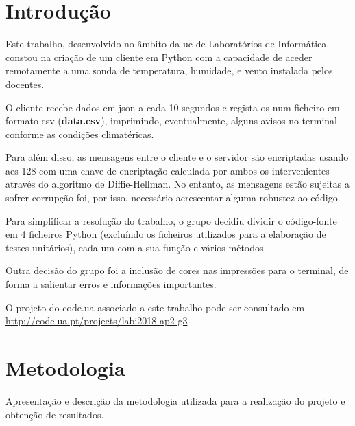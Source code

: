 \documentclass{report}
\begin{document}
\tableofcontents
\listoffigures


\clearpage
{}


\chapter{Introdução}
\label{chap.introducao}

Este trabalho, desenvolvido no âmbito da \ac{uc} de Laboratórios de Informática, constou na criação de um cliente em Python com a capacidade de aceder remotamente a uma sonda de temperatura, humidade, e vento instalada pelos docentes. 

O cliente recebe dados em \ac{json} a cada 10 segundos e regista-os num ficheiro em formato \ac{csv} (\textbf{data.csv}), imprimindo, eventualmente, alguns avisos no terminal conforme as condições climatéricas.\newline

Para além disso, as mensagens entre o cliente e o servidor são encriptadas usando \ac{aes}-128 com uma chave de encriptação calculada por ambos os intervenientes através do algoritmo de Diffie-Hellman. No entanto, as mensagens estão sujeitas a sofrer corrupção foi, por isso, necessário acrescentar alguma robustez ao código.\newline

\hfill

Para simplificar a resolução do trabalho, o grupo decidiu dividir o código-fonte em 4 ficheiros Python (excluíndo os ficheiros utilizados para a elaboração de testes unitários), cada um com a sua função e vários métodos. 

Outra decisão do grupo foi a inclusão de cores nas impressões para o terminal, de forma a salientar erros e informações importantes.\newline 

O projeto do code.ua associado a este trabalho pode ser consultado em \url{http://code.ua.pt/projects/labi2018-ap2-g3}


\chapter{Metodologia}
\label{chap.metodologia}
Apresentação e descrição da metodologia utilizada para a realização do projeto e obtenção de resultados.
\end{document}
